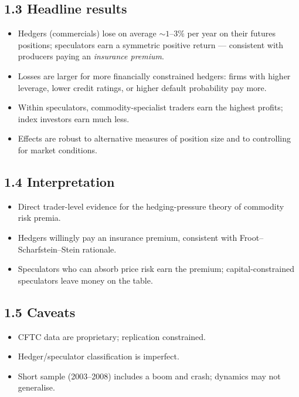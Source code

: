 \documentclass[11pt]{article}
\begin{document}
\subsection*{1.3 Headline results}
\begin{itemize}
\item Hedgers (commercials) lose on average $\sim 1$--$3\%$ per year on their futures positions; speculators earn a symmetric positive return --- consistent with producers paying an \emph{insurance premium}.
\item Losses are larger for more financially constrained hedgers: firms with higher leverage, lower credit ratings, or higher default probability pay more.
\item Within speculators, commodity-specialist traders earn the highest profits; index investors earn much less.
\item Effects are robust to alternative measures of position size and to controlling for market conditions.
\end{itemize}

\subsection*{1.4 Interpretation}
\begin{itemize}
\item Direct trader-level evidence for the hedging-pressure theory of commodity risk premia.
\item Hedgers willingly pay an insurance premium, consistent with Froot--Scharfstein--Stein rationale.
\item Speculators who can absorb price risk earn the premium; capital-constrained speculators leave money on the table.
\end{itemize}

\subsection*{1.5 Caveats}
\begin{alertbox}
\begin{itemize}
\item CFTC data are proprietary; replication constrained.
\item Hedger/speculator classification is imperfect.
\item Short sample (2003--2008) includes a boom and crash; dynamics may not generalise.
\end{itemize}
\end{alertbox}
\end{document}
